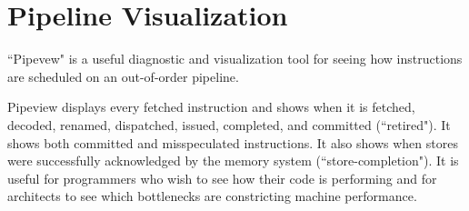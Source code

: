 \chapter{Pipeline Visualization}
\label{sec:visualization}


``Pipevew" is a useful diagnostic and visualization tool for seeing how instructions are scheduled on an out-of-order pipeline.

Pipeview displays every fetched instruction and shows when it is fetched, decoded, renamed, dispatched, issued, completed, and committed (``retired").  It shows both committed and misspeculated instructions. It also shows when stores were successfully acknowledged by the memory system (``store-completion").  It is useful for programmers who wish to see how their code is performing and for architects to see which bottlenecks are constricting machine performance.
  
